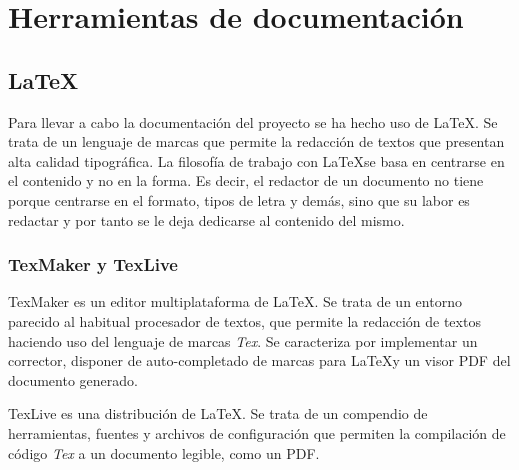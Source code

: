 \section{Herramientas de documentación}

\subsection{\LaTeX}

Para llevar a cabo la documentación del proyecto se ha hecho uso de \LaTeX \citep{wiki:latex}. Se trata de un lenguaje de marcas que permite la redacción de textos que presentan alta calidad tipográfica. La filosofía de trabajo con \LaTeX   se basa en centrarse en el contenido y no en la forma. Es decir, el redactor de un documento no tiene porque centrarse en el formato, tipos de letra y demás, sino que su labor es redactar y por tanto se le deja dedicarse al contenido del mismo.

\subsubsection{TexMaker y TexLive}
TexMaker es un editor multiplataforma de \LaTeX. Se trata de un entorno parecido al habitual procesador de textos, que permite la redacción de textos haciendo uso del lenguaje de marcas \textit{Tex}. Se caracteriza por implementar un corrector, disponer de auto-completado de marcas para \LaTeX y un visor PDF del documento generado. \citep{wiki:TexMaker}

TexLive es una distribución de \LaTeX. Se trata de un compendio de herramientas, fuentes y archivos de configuración que permiten la compilación de código \textit{Tex} a un documento legible, como un PDF. \citep{wiki:TexLive}






